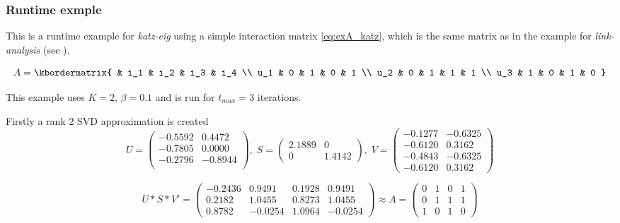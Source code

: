 \subsubsection{Runtime exmple}

This is a runtime example for \textit{katz-eig} using a simple interaction matrix \eqref{eq:exA_katz}, which is the same matrix as in the example for \textit{link-analysis} (see ).

\begin{equation}\label{eq:exA_katz}
  A = \kbordermatrix{
    &    i_1 & i_2 & i_3 & i_4 \\
    u_1 & 0   & 1   & 0   & 1  \\
    u_2 & 0   & 1   & 1   & 1  \\
    u_3 & 1   & 0   & 1   & 0
  }
\end{equation}

This example uses $K = 2$, $\beta = 0.1$ and is run for $t_{max} = 3$ iterations.

Firstly a rank 2 SVD approximation is created
\[
U = \begin{pmatrix}
    -0.5592 &  0.4472 \\
    -0.7805 &  0.0000 \\
    -0.2796 & -0.8944 \\
\end{pmatrix},
\;
S = \begin{pmatrix}
    2.1889  &      0 \\
         0  & 1.4142
\end{pmatrix},
\;
V = \begin{pmatrix}
   -0.1277 & -0.6325 \\
   -0.6120 &  0.3162 \\
   -0.4843 & -0.6325 \\
   -0.6120 &  0.3162
\end{pmatrix}
\]

\[
    U * S * V' = \begin{pmatrix}
       -0.2436 &  0.9491  & 0.1928 &  0.9491 \\
        0.2182 &  1.0455  & 0.8273 &  1.0455 \\
        0.8782 & -0.0254  & 1.0964 & -0.0254
    \end{pmatrix}
    \approx
    A = \begin{pmatrix}
        0   & 1   & 0   & 1 \\
        0   & 1   & 1   & 1 \\
        1   & 0   & 1   & 0
    \end{pmatrix}
\]

